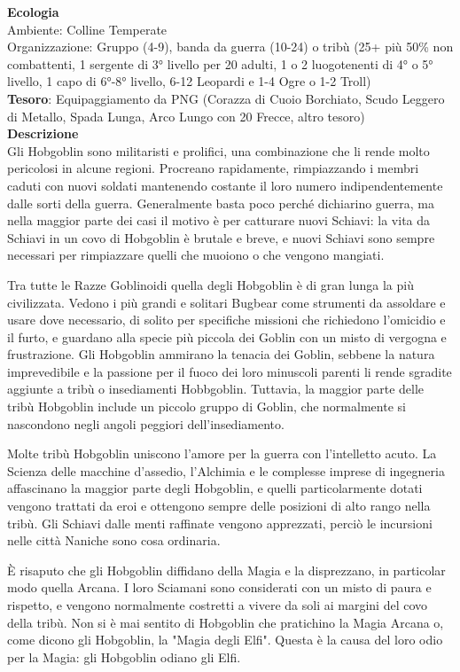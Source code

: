 \begin{multicols}{2}
	\textbf{Ecologia}\\
	Ambiente: Colline Temperate\\
	Organizzazione: Gruppo (4-9), banda da guerra (10-24) o tribù (25+ più 50\% non combattenti, 1 sergente di 3° livello per 20 adulti, 1 o 2 luogotenenti di 4° o 5° livello, 1 capo di 6°-8° livello, 6-12 Leopardi e 1-4 Ogre o 1-2 Troll)\\
	\textbf{Tesoro}: Equipaggiamento da PNG (Corazza di Cuoio Borchiato, Scudo Leggero di Metallo, Spada Lunga, Arco Lungo con 20 Frecce, altro tesoro)\\
	\textbf{Descrizione}\\
	Gli Hobgoblin sono militaristi e prolifici, una combinazione che li rende molto pericolosi in alcune regioni. Procreano rapidamente, rimpiazzando i membri caduti con nuovi soldati mantenendo costante il loro numero indipendentemente dalle sorti della guerra. Generalmente basta poco perché dichiarino guerra, ma nella maggior parte dei casi il motivo è per catturare nuovi Schiavi: la vita da Schiavi in un covo di Hobgoblin è brutale e breve, e nuovi Schiavi sono sempre necessari per rimpiazzare quelli che muoiono o che vengono mangiati.

	Tra tutte le Razze Goblinoidi quella degli Hobgoblin è di gran lunga la più civilizzata.
	Vedono i più grandi e solitari Bugbear come strumenti da assoldare e usare dove necessario, di solito per specifiche missioni che richiedono l'omicidio e il furto, e guardano alla specie più piccola dei Goblin con un misto di vergogna e frustrazione. Gli Hobgoblin ammirano la tenacia dei Goblin, sebbene la natura imprevedibile e la passione per il fuoco dei loro minuscoli parenti li rende sgradite aggiunte a tribù o insediamenti Hobbgoblin. Tuttavia, la maggior parte delle tribù Hobgoblin include un piccolo gruppo di Goblin, che normalmente si nascondono negli angoli peggiori dell'insediamento.

	Molte tribù Hobgoblin uniscono l'amore per la guerra con l'intelletto acuto. La Scienza delle macchine d'assedio, l'Alchimia e le complesse imprese di ingegneria affascinano la maggior parte degli Hobgoblin, e quelli particolarmente dotati vengono trattati da eroi e ottengono sempre delle posizioni di alto rango nella tribù. Gli Schiavi dalle menti raffinate vengono apprezzati, perciò le incursioni nelle città Naniche sono cosa ordinaria.

	È risaputo che gli Hobgoblin diffidano della Magia e la disprezzano, in particolar modo quella Arcana. I loro Sciamani sono considerati con un misto di paura e rispetto, e vengono normalmente costretti a vivere da soli ai margini del covo della tribù. Non si è mai sentito di Hobgoblin che pratichino la Magia Arcana o, come dicono gli Hobgoblin, la "Magia degli Elfi". Questa è la causa del loro odio per la Magia: gli Hobgoblin odiano gli Elfi.


\end{multicols}
